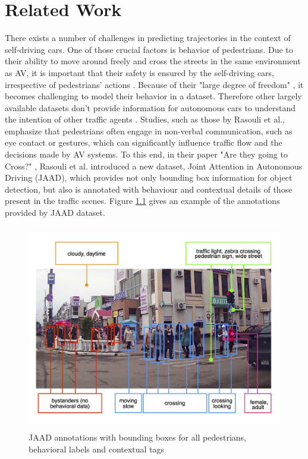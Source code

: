 \chapter{Related Work}

\tab There exists a number of challenges in predicting trajectories in the context of self-driving cars. One of those crucial factors is behavior of pedestrians. Due to their ability to move around freely and cross the streets in the same environment as AV, it is important that their safety is ensured by the self-driving cars, irrespective of pedestrians' actions \cite{fragkedaki2024pedestrianmotionpredictionusing}. Because of their "large degree of freedom" \cite{fragkedaki2024pedestrianmotionpredictionusing}, it becomes challenging to model their behavior in a dataset. Therefore other largely available datasets don't provide information for autonomous cars to understand the intention of other traffic agents \cite{rasouli2017ICCVW}. Studies, such as those by Rasouli et al.\cite{rasouli2017ICCVW}, emphasize that pedestrians often engage in non-verbal communication, such as eye contact or gestures, which can significantly influence traffic flow and the decisions made by AV systems. To this end, in their paper "Are they going to Cross?" \cite{rasouli2017ICCVW}, Rasouli et al. introduced a new dataset, Joint Attention in Autonomous Driving (JAAD), which provides not only bounding box information for object detection, but also is annotated with behaviour and contextual details of those present in the traffic scenes. Figure \ref{fig:jaad1} gives an example of the annotations provided by JAAD dataset. 


\begin{figure}[h]
  \begin{center}
     \includegraphics[height=90mm]{Images/Figures/jaad_fig1.png}
  \end{center}
  \caption{JAAD annotations with bounding boxes for all pedestrians, behavioral labels and contextual tags}
  \label{fig:jaad1}
\end{figure}

